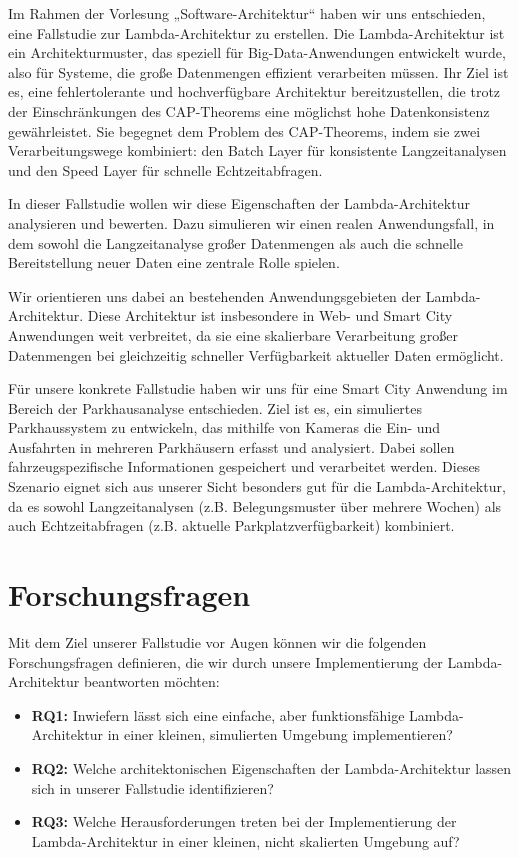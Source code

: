 Im Rahmen der Vorlesung „Software-Architektur“ haben wir uns entschieden, eine Fallstudie zur Lambda-Architektur zu erstellen. Die Lambda-Architektur ist ein Architekturmuster, das speziell für Big-Data-Anwendungen entwickelt wurde, also für Systeme, die große Datenmengen effizient verarbeiten müssen. Ihr Ziel ist es, eine fehlertolerante und hochverfügbare Architektur bereitzustellen, die trotz der Einschränkungen des CAP-Theorems eine möglichst hohe Datenkonsistenz gewährleistet. Sie begegnet dem Problem des CAP-Theorems, indem sie zwei Verarbeitungswege kombiniert: den Batch Layer für konsistente Langzeitanalysen und den Speed Layer für schnelle Echtzeitabfragen.

In dieser Fallstudie wollen wir diese Eigenschaften der Lambda-Architektur analysieren und bewerten. Dazu simulieren wir einen realen Anwendungsfall, in dem sowohl die Langzeitanalyse großer Datenmengen als auch die schnelle Bereitstellung neuer Daten eine zentrale Rolle spielen.

Wir orientieren uns dabei an bestehenden Anwendungsgebieten der Lambda-Architektur. Diese Architektur ist insbesondere in Web- und Smart City Anwendungen weit verbreitet, da sie eine skalierbare Verarbeitung großer Datenmengen bei gleichzeitig schneller Verfügbarkeit aktueller Daten ermöglicht.

Für unsere konkrete Fallstudie haben wir uns für eine Smart City Anwendung im Bereich der Parkhausanalyse entschieden. Ziel ist es, ein simuliertes Parkhaussystem zu entwickeln, das mithilfe von Kameras die Ein- und Ausfahrten in mehreren Parkhäusern erfasst und analysiert. Dabei sollen fahrzeugspezifische Informationen gespeichert und verarbeitet werden. Dieses Szenario eignet sich aus unserer Sicht besonders gut für die Lambda-Architektur, da es sowohl Langzeitanalysen (z.B. Belegungsmuster über mehrere Wochen) als auch Echtzeitabfragen (z.B. aktuelle Parkplatzverfügbarkeit) kombiniert.


\section{Forschungsfragen}
Mit dem Ziel unserer Fallstudie vor Augen können wir die folgenden Forschungsfragen definieren, die wir durch unsere Implementierung der Lambda-Architektur beantworten möchten:
\begin{itemize}
	\item \textbf{RQ1:} Inwiefern lässt sich eine einfache, aber funktionsfähige Lambda-Architektur in einer kleinen, simulierten Umgebung implementieren?
	\item \textbf{RQ2:} Welche architektonischen Eigenschaften der Lambda-Architektur lassen sich in unserer Fallstudie identifizieren?
	\item \textbf{RQ3:} Welche Herausforderungen treten bei der Implementierung der Lambda-Architektur in einer kleinen, nicht skalierten Umgebung auf?
\end{itemize}

